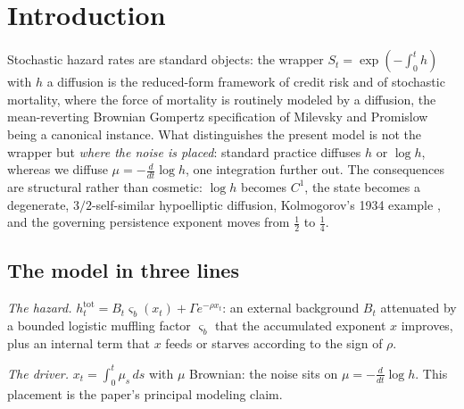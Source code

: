 \begin{abstract}
\end{abstract}

\section{Introduction}\label{sec:intro}

Stochastic hazard rates are standard objects: the wrapper
$S_t=\exp(-\int_0^t h)$ with $h$ a diffusion is the reduced-form
framework of credit risk \cite{Lan04} and of stochastic mortality,
where the force of mortality is routinely modeled by a diffusion, the
mean-reverting Brownian Gompertz specification of Milevsky and
Promislow \cite{MP01} being a canonical instance. What distinguishes
the present model is not the wrapper but \emph{where the noise is
placed}: standard practice diffuses $h$ or $\log h$, whereas we diffuse
$\mu=-\tfrac{d}{dt}\log h$, one integration further out. The
consequences are structural rather than cosmetic: $\log h$ becomes
$C^1$, the state becomes a degenerate, $3/2$-self-similar hypoelliptic
diffusion, Kolmogorov's 1934 example \cite{Kol34,Hor67}, and the
governing persistence exponent moves from $\tfrac12$ to $\tfrac14$.

\subsection{The model in three lines}
\emph{The hazard.}
$h^{\mathrm{tot}}_t=B_t\varsigma_b(x_t)+\Gamma e^{-\rho x_t}$: an
external background $B_t$ attenuated by a bounded logistic muffling
factor $\varsigma_b$ that the accumulated exponent $x$ improves, plus
an internal term that $x$ feeds or starves according to the sign of
$\rho$.

\emph{The driver.} $x_t=\int_0^t\mu_s\,ds$ with $\mu$ Brownian: the
noise sits on $\mu=-\frac{d}{dt}\log h$. This placement is the paper's
principal modeling claim.

